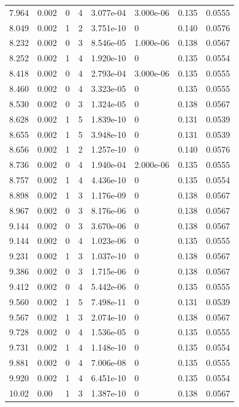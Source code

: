 \documentclass[preview]{standalone}
\begin{document}
{{{\begin{tabular}{L{1.2cm}C{1.2cm} C{0.3cm}C{0.5cm} C{1.4cm}C{1.4cm} C{1.4cm}C{1.4cm}}
  7.964  &  0.002  & 0     &  4 &  3.077e-04  & 3.000e-06  & 0.135 &  0.0555   \\ 
  8.049  &  0.002  & 1     &  2 &  3.751e-10  & 0  & 0.140 &  0.0576   \\ 
  8.232  &  0.002  & 0     &  3 &  8.546e-05  & 1.000e-06  & 0.138 &  0.0567   \\ 
  8.252  &  0.002  & 1     &  4 &  1.920e-10  & 0  & 0.135 &  0.0554   \\ 
  8.418  &  0.002  & 0     &  4 &  2.793e-04  & 3.000e-06  & 0.135 &  0.0555   \\ 
  8.460  &  0.002  & 0     &  4 &  3.323e-05  & 0  & 0.135 &  0.0555   \\ 
  8.530  &  0.002  & 0     &  3 &  1.324e-05  & 0  & 0.138 &  0.0567   \\ 
  8.628  &  0.002  & 1     &  5 &  1.839e-10  & 0  & 0.131 &  0.0539   \\ 
  8.655  &  0.002  & 1     &  5 &  3.948e-10  & 0  & 0.131 &  0.0539   \\ 
  8.656  &  0.002  & 1     &  2 &  1.257e-10  & 0  & 0.140 &  0.0576   \\ 
  8.736  &  0.002  & 0     &  4 &  1.940e-04  & 2.000e-06  & 0.135 &  0.0555   \\ 
  8.757  &  0.002  & 1     &  4 &  4.436e-10  & 0  & 0.135 &  0.0554   \\ 
  8.898  &  0.002  & 1     &  3 &  1.176e-09  & 0  & 0.138 &  0.0567   \\ 
  8.967  &  0.002  & 0     &  3 &  8.176e-06  & 0  & 0.138 &  0.0567   \\ 
  9.144  &  0.002  & 0     &  3 &  3.670e-06  & 0  & 0.138 &  0.0567   \\ 
  9.144  &  0.002  & 0     &  4 &  1.023e-06  & 0  & 0.135 &  0.0555   \\ 
  9.231  &  0.002  & 1     &  3 &  1.037e-10  & 0  & 0.138 &  0.0567   \\ 
  9.386  &  0.002  & 0     &  3 &  1.715e-06  & 0  & 0.138 &  0.0567   \\ 
  9.412  &  0.002  & 0     &  4 &  5.442e-06  & 0  & 0.135 &  0.0555   \\ 
  9.560  &  0.002  & 1     &  5 &  7.498e-11  & 0  & 0.131 &  0.0539   \\ 
  9.567  &  0.002  & 1     &  3 &  2.074e-10  & 0  & 0.138 &  0.0567   \\ 
  9.728  &  0.002  & 0     &  4 &  1.536e-05  & 0  & 0.135 &  0.0555   \\ 
  9.731  &  0.002  & 1     &  4 &  1.148e-10  & 0  & 0.135 &  0.0554   \\ 
  9.881  &  0.002  & 0     &  4 &  7.006e-08  & 0  & 0.135 &  0.0555   \\ 
  9.920  &  0.002  & 1     &  4 &  6.451e-10  & 0  & 0.135 &  0.0554   \\ 
  10.02  &  0.00  & 1     &  3 &  1.387e-10  & 0  & 0.138 &  0.0567   \\ 
\hline 
\end{tabular} 

}}}
\end{document}
